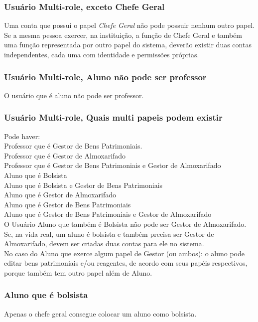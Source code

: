 \subsubsection{Usuário Multi-role, exceto Chefe Geral}
\begin{regra}
Uma conta que possui o papel \textit{Chefe Geral} não pode possuir nenhum outro papel. Se a mesma pessoa exercer, na instituição, a função de Chefe Geral e também uma função representada por outro papel do sistema, deverão existir duas contas independentes, cada uma com identidade e permissões próprias.
\end{regra}
\subsubsection{Usuário Multi-role, Aluno não pode ser professor}
\begin{regra}
O usuário que é aluno não pode ser professor.
\end{regra}
\subsubsection{Usuário Multi-role, Quais multi papeis podem existir}
\begin{regra}
Pode haver:\\
Professor que é Gestor de Bens Patrimoniais.\\
Professor que é Gestor de Almoxarifado\\
Professor que é Gestor de Bens Patrimoniais e Gestor de Almoxarifado\\
Aluno que é Bolsista\\
Aluno que é Bolsista e Gestor de Bens Patrimoniais\\
Aluno que é Gestor de Almoxarifado\\
Aluno que é Gestor de Bens Patrimoniais\\
Aluno que é Gestor de Bens Patrimoniais e Gestor de Almoxarifado\\
O Usuário Aluno que também é Bolsista não pode ser Gestor de Almoxarifado. Se, na vida real, um aluno é bolsista e também precisa ser Gestor de Almoxarifado, devem ser criadas duas contas para ele no sistema.\\
No caso do Aluno que exerce algum papel de Gestor (ou ambos): o aluno pode editar bens patrimoniais e/ou reagentes, de acordo com seus papéis respectivos, porque também tem outro papel além de Aluno.
\end{regra}
\subsubsection{Aluno que é bolsista}
\begin{regra}
Apenas o chefe geral consegue colocar um aluno como bolsista.
\end{regra}
